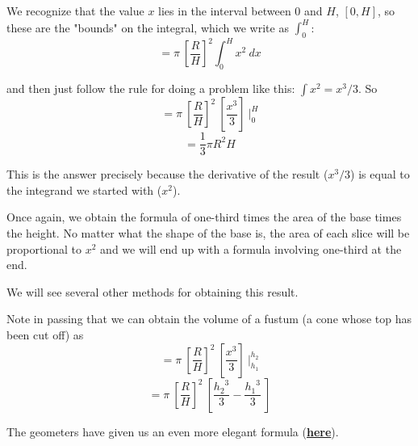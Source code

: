 \documentclass[11pt, oneside]{article}
\begin{document}
We recognize that the value $x$ lies in the interval between $0$ and $H$, $[0,H]$, so these are the "bounds" on the integral, which we write as $\int_0^H$:
\[ = \pi \ [ \frac{R}{H} ]^2 \int_0^H x^2 \ dx \]

and then just follow the rule for doing a problem like this:  $\int x^2 = x^3/3$.  So
\[ = \pi \ [ \frac{R}{H} ]^2 \ [  \frac{x^3}{3} ] \ \bigg |_0^H \]
\[ = \frac{1}{3} \pi R^2 H \]

This is the answer precisely because the derivative of the result ($x^3/3$) is equal to the integrand we started with ($x^2$).

Once again, we obtain the formula of one-third times the area of the base times the height.  No matter what the shape of the base is, the area of each slice will be proportional to $x^2$ and we will end up with a formula involving one-third at the end.

We will see several other methods for obtaining this result.

Note in passing that we can obtain the volume of a fustum (a cone whose top has been cut off) as
\[ = \pi \ [ \frac{R}{H} ]^2 \ [  \frac{x^3}{3} ] \ \bigg |_{h_1}^{h_2} \]
\[ = \pi \ [ \frac{R}{H} ]^2 \ [  \frac{{h_2}^3}{3} -  \frac{{h_1}^3}{3}  \ ] \]

The geometers have given us an even more elegant formula (\hyperref[sec:Frustum]{\textbf{here}}).
\end{document}
